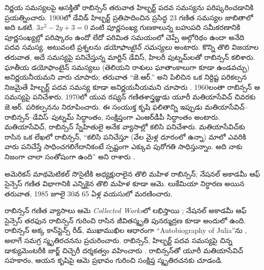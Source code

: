 \documentclass[../../../include/open-logic-section]{subfiles}
\begin{document}
నిర్ణయ సమస్యలపై ఆసక్తితో రాబిన్సన్ తరువాత హిల్బర్ట్ పదవ సమస్యను పరిష్కరించడానికి ప్రయత్నించారు. 1900లో డేవిడ్ హిల్బర్ట్ ప్రతిపాదించిన ప్రసిద్ధ 23 గణిత సమస్యల జాబితాలో అది ఒకటి. $3x^2 - 2y +3 = 0$ వంటి పూర్ణసంఖ్య గుణకాలున్న బహుపది సమీకరణానికి పూర్ణసంఖ్యల్లో పరిష్కారం ఉందో లేదో పరిమిత సమయంలో చెప్పే అల్గోరిథం ఉందా అనేది పదవ సమస్య. అటువంటి ప్రశ్నలను \emph{డయోఫాంటైన్ సమస్యలు} అంటారు. కొన్ని తొలి విజయాల తరువాత, అదే సమస్యపై పనిచేస్తున్న మార్టిన్ డేవిస్, హిలరీ పుట్నమ్‌లతో రాబిన్సన్ కలిశారు. ఘాతీయ డయోఫాంటైన్ సమస్యలు (తెలియని రాశులు ఘాతాంకాలుగా కూడా ఉండవచ్చు) అనిర్ణయనీయమని వారు చూపారు; తరువాత ``జె.ఆర్.'' అని పిలిచిన ఒక నిర్దిష్ట పరికల్పన నిజమైతే హిల్బర్ట్ పదవ సమస్య కూడా అనిర్ణయనీయమని చూపారు \citep{DavisPutnamRobinson1961}. 1960లంతా రాబిన్సన్ ఆ సమస్యపై పనిచేశారు. 1970లో యువ రష్యన్ గణితశాస్త్రజ్ఞుడు యూరీ మతియాసేవిచ్ చివరకు జె.ఆర్. పరికల్పనను నిరూపించారు. ఈ సంయుక్త కృషి ఫలితాన్ని ఇప్పుడు మతియాసేవిచ్--రాబిన్సన్--డేవిస్--పుట్నమ్ సిద్ధాంతం, సంక్షిప్తంగా ఎంఆర్‌డీపీ సిద్ధాంతం అంటారు. మతియాసేవిచ్, రాబిన్సన్ స్నేహితులై అనేక వ్యాసాల్లో కలిసి పనిచేశారు. మతియాసేవిచ్‌కు రాసిన ఒక లేఖలో రాబిన్సన్, ``కలిసి పనిచేస్తూ (వేల మైళ్ల దూరంలో ఉన్నా) మాలో ఎవరికి వారు పనిచేస్తే సాధించగలిగేదానికంటే స్పష్టంగా ఎక్కువ పురోగతి సాధిస్తున్నాం. అది నాకు నిజంగా చాలా సంతోషంగా ఉంది'' అని రాశారు \citep[45]{Matijasevich1992}.

అమెరికన్ మాథమెటికల్ సొసైటీకి అధ్యక్షురాలైన తొలి మహిళ రాబిన్సన్; నేషనల్ అకాడమీ ఆఫ్ సైన్సెస్‌ గణిత విభాగానికి ఎన్నికైన తొలి మహిళ కూడా ఆమె. లుకేమియా నిర్ధారణ అయిన తరువాత, 1985 జూలై 30న 65 ఏళ్ల వయసులో మరణించారు.

\begin{reading}
రాబిన్సన్ గణిత వ్యాసాలు ఆమె \textit{Collected
  Works}లో లభిస్తాయి \citep{Robinson1996}; నేషనల్ అకాడమీ ఆఫ్ సైన్సెస్ తరఫున రాబిన్సన్ గురించి రాసిన జీవితస్మృతి \citep{Feferman1994} పునర్ముద్రణ కూడా అందులో ఉంది. రాబిన్సన్ అక్క కాన్‌స్టెన్స్ రీడ్, ముఖాముఖిల ఆధారంగా ``Autobiography of Julia''ను \citep{Reid1986}, అలాగే సమగ్ర స్మృతిరచనను \citep{Reid1996} ప్రచురించారు. రాబిన్సన్, హిల్బర్ట్ పదవ సమస్యపై చిన్న డాక్యుమెంటరీకి జార్జ్ చిచ్చెరీ దర్శకత్వం వహించారు \citep{Csicsery2016}. రాబిన్సన్‌తో యూరీ మతియాసేవిచ్ సహకారం, ఆయన కృషిపై ఆమె ప్రభావం గురించి సంక్షిప్త స్మృతిరచనకు \citep{Matijasevich1992} చూడండి.
\end{reading}
\end{document}
